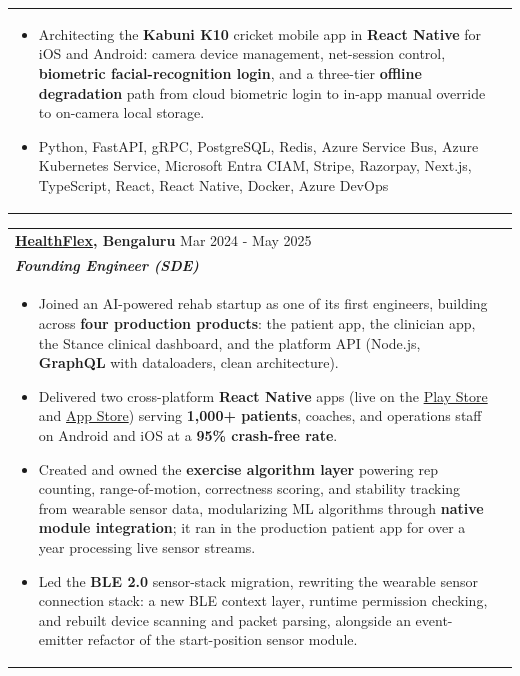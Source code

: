 \documentclass[a4paper,8pt]{article}
\begin{document}
\begin{tabularx}{\linewidth}{ @{}l r@{} }
\begin{minipage}[t]{\linewidth}
\begin{itemize}[nosep,after=\strut, leftmargin=2em, itemsep=2pt]
        \item Architecting the \textbf{Kabuni K10} cricket mobile app in \textbf{React Native} for iOS and Android: camera device management, net-session control, \textbf{biometric facial-recognition login}, and a three-tier \textbf{offline degradation} path from cloud biometric login to in-app manual override to on-camera local storage.
        \item Python, FastAPI, gRPC, PostgreSQL, Redis, Azure Service Bus, Azure Kubernetes Service, Microsoft Entra CIAM, Stripe, Razorpay, Next.js, TypeScript, React, React Native, Docker, Azure DevOps
    \end{itemize}
\end{minipage}
\end{tabularx}

\begin{tabularx}{\linewidth}{ @{}l r@{} }
\color[HTML]{1C033C} \textbf{{\href{https://www.healthflex.in/}{HealthFlex}, Bengaluru}} \hfill \color[HTML]{371e77} Mar 2024 - May 2025 \\[4pt]
\color[HTML]{371e77}\textbf{\textit{Founding Engineer (SDE)}}\ \hfill \color[HTML]{4B28A4} \\[5pt]
\begin{minipage}[t]{\linewidth}
    \begin{itemize}[nosep,after=\strut, leftmargin=2em, itemsep=2pt]
        \item Joined an AI-powered rehab startup as one of its first engineers, building across \textbf{four production products}: the patient app, the clinician app, the Stance clinical dashboard, and the platform API (Node.js, \textbf{GraphQL} with dataloaders, clean architecture).
        \item Delivered two cross-platform \textbf{React Native} apps (live on the \href{https://play.google.com/store/apps/developer?id=HealthFlex}{Play Store} and \href{https://apps.apple.com/in/developer/deftronin-technologies-private-limited/id1734219179}{App Store}) serving \textbf{1,000+ patients}, coaches, and operations staff on Android and iOS at a \textbf{95\% crash-free rate}.
        \item Created and owned the \textbf{exercise algorithm layer} powering rep counting, range-of-motion, correctness scoring, and stability tracking from wearable sensor data, modularizing ML algorithms through \textbf{native module integration}; it ran in the production patient app for over a year processing live sensor streams.
        \item Led the \textbf{BLE 2.0} sensor-stack migration, rewriting the wearable sensor connection stack: a new BLE context layer, runtime permission checking, and rebuilt device scanning and packet parsing, alongside an event-emitter refactor of the start-position sensor module.

\end{itemize}
\end{minipage}
\end{tabularx}
\end{document}
